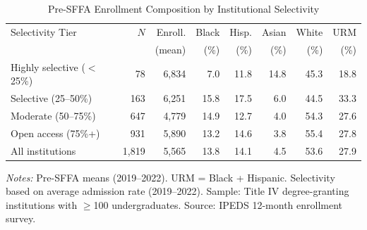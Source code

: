 \begin{table}[htbp]
\centering
\caption{Pre-SFFA Enrollment Composition by Institutional Selectivity}
\label{tab:summary}
\begin{threeparttable}
\footnotesize
\begin{tabular}{lrrrrrrr}
\toprule
Selectivity Tier & $N$ & Enroll. & Black & Hisp. & Asian & White & URM \\
 & & (mean) & (\%) & (\%) & (\%) & (\%) & (\%) \\
\midrule
Highly selective ($<$25\%) & 78 & 6,834 & 7.0 & 11.8 & 14.8 & 45.3 & 18.8 \\
Selective (25--50\%) & 163 & 6,251 & 15.8 & 17.5 & 6.0 & 44.5 & 33.3 \\
Moderate (50--75\%) & 647 & 4,779 & 14.9 & 12.7 & 4.0 & 54.3 & 27.6 \\
Open access (75\%+) & 931 & 5,890 & 13.2 & 14.6 & 3.8 & 55.4 & 27.8 \\
\midrule
All institutions & 1,819 & 5,565 & 13.8 & 14.1 & 4.5 & 53.6 & 27.9 \\
\bottomrule
\end{tabular}
\begin{tablenotes}[flushleft]\small
\item \textit{Notes:} Pre-SFFA means (2019--2022). URM = Black + Hispanic. Selectivity based on average admission rate (2019--2022). Sample: Title IV degree-granting institutions with $\geq$100 undergraduates. Source: IPEDS 12-month enrollment survey.
\end{tablenotes}
\end{threeparttable}
\end{table}

